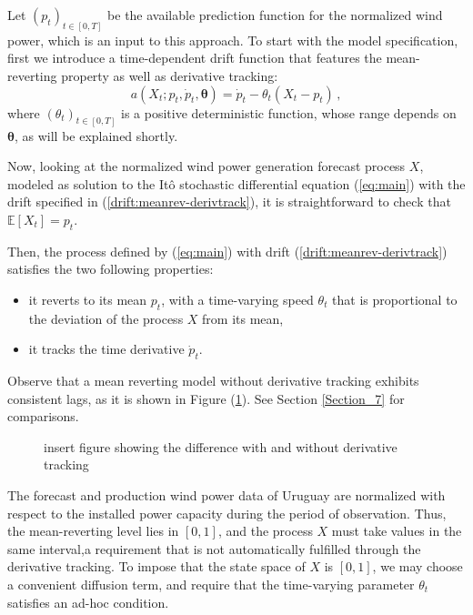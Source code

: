 \documentclass[11pt]{article}
\theoremstyle{definition}
\begin{document}
Let $(p_t)_{t \in [0,T]}$ be the available prediction function for the normalized wind power, which is an input to this approach. To start with the model specification, first we introduce a time-dependent drift function that features the mean-reverting property as well as derivative tracking:
\begin{equation}
a(X_t; p_t, \dot{p}_t, \bm{\theta}) = \dot{p}_t  - \theta_t (X_t - p_t)\,,  \label{drift:meanrev-derivtrack}
\end{equation} 
where $ (\theta_t)_{t \in [0,T]} $ is a positive deterministic function, whose range depends on $\bm{\theta}$, as will be explained shortly.

Now, looking at the normalized wind power generation forecast process $X$, modeled as solution to the It\^{o} stochastic differential equation (\ref{eq:main}) with the drift specified in (\ref{drift:meanrev-derivtrack}), it is straightforward to check that $\mathbb{E} \left[X_t\right] = p_t$.

 Then, the process defined by (\ref{eq:main}) with drift (\ref{drift:meanrev-derivtrack}) satisfies the two following properties: 
\begin{itemize}
\item it reverts to its mean $p_t$, with a time-varying speed $ \theta_t$ that is proportional to the deviation of the process $X$ from its mean,
\item it tracks the time derivative $\dot{p}_t$.  
\end{itemize} 
Observe that a mean reverting model without derivative tracking exhibits consistent lags, as it is shown in Figure (\ref{fig:derivative_tracking}). See Section \ref{Section_7} for comparisons.

\begin{figure}
  \caption{insert figure showing the difference with and without derivative tracking}
  \label{fig:derivative_tracking}
\end{figure}

The forecast and production wind power data of Uruguay are normalized with respect to the installed power capacity during the period of observation. Thus, the mean-reverting level lies in $[0,1]$, and the process $X$  must take values in the same interval,a requirement that is not automatically fulfilled through the derivative tracking. To impose that the state space of $X$ is $[0,1]$, we may choose a convenient diffusion term, and require that the time-varying parameter $ \theta_t$ satisfies an ad-hoc condition.
 
\end{document}
